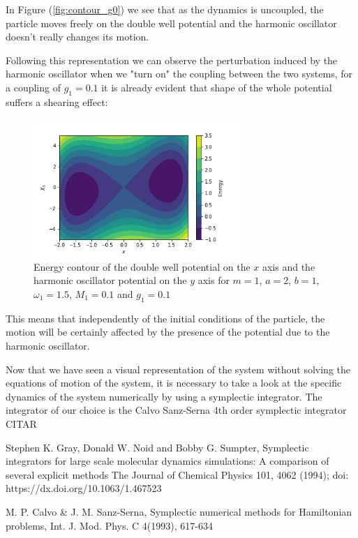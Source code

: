 In Figure (\ref{fig:contour_g0}) we see that as the dynamics is uncoupled, the particle moves freely on the double well potential and the harmonic oscillator doesn't really changes its motion. \par 

Following this representation we can observe the perturbation induced by the harmonic oscillator when we "turn on" the coupling between the two systems, for a coupling of $g_1=0.1$ it is already evident that shape of the whole potential suffers a shearing effect:

\begin{figure}[H]
\centering
\includegraphics[width=0.7\textwidth]{Figures/energy_contour_coupled01.png}
\caption{Energy contour of the double well potential on the $x$ axis and the harmonic oscillator potential on the $y$ axis for $m=1$, $a=2$, $b=1$, $\omega_1=1.5$, $M_1=0.1$ and $g_1=0.1$\label{fig:contour_g01}}

\end{figure}
This means that independently of the initial conditions of the particle, the motion will be certainly affected by the presence of the potential due to the harmonic oscillator.\par 

Now that we have seen a visual representation of the system without solving the equations of motion of the system, it is necessary to take a look at the specific dynamics of the system numerically by using a symplectic integrator. The integrator of our choice is the Calvo Sanz-Serna 4th order symplectic integrator CITAR 

Stephen K. Gray, Donald W. Noid and Bobby G. Sumpter, Symplectic integrators for large scale molecular dynamics simulations: A comparison of several explicit methods The Journal of Chemical Physics 101, 4062 (1994); doi: https://dx.doi.org/10.1063/1.467523

M. P. Calvo & J. M. Sanz-Serna, Symplectic numerical methods for Hamiltonian problems, Int. J. Mod. Phys. C 4(1993), 617-634

